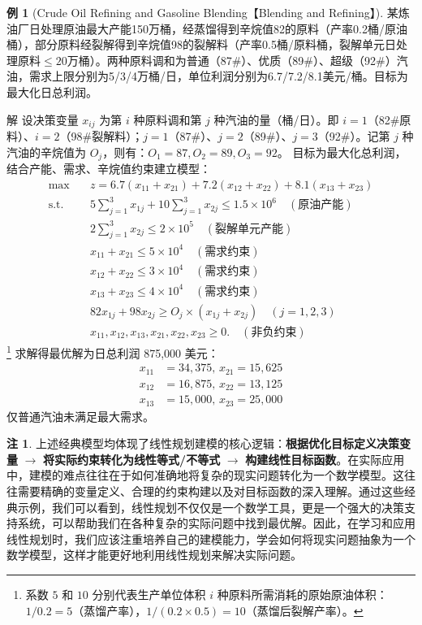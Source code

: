 \documentclass[12pt]{article}
\theoremstyle{plain}
\theoremstyle{definition}
\newtheorem{rmk}{注}[subsection]
\newtheorem{exm}{例}[subsection]
\newenvironment{slv}[1][解]{\begin{paragraph}{#1}\mbox{}}{\end{paragraph}\par\nopagebreak}
\newcommand{\st}{\mathrel{\text{s.t.}}}
\begin{document}
\begin{exm}[Crude Oil Refining and Gasoline Blending【Blending and Refining】]
    某炼油厂日处理原油最大产能150万桶，经蒸馏得到辛烷值82的原料（产率0.2桶/原油桶），部分原料经裂解得到辛烷值98的裂解料（产率0.5桶/原料桶，裂解单元日处理原料$\leq20$万桶）。两种原料调和为普通（87\#）、优质（89\#）、超级（92\#）汽油，需求上限分别为5/3/4万桶/日，单位利润分别为6.7/7.2/8.1美元/桶。目标为最大化日总利润。

    \begin{slv}
    设决策变量 $x_{ij}$ 为第 $i$ 种原料调和第 $j$ 种汽油的量（桶/日）。即 $i=1$（82\#原料）、$i=2$（98\#裂解料）；$j=1$（87\#）、$j=2$（89\#）、$j=3$（92\#）。记第 $j$ 种汽油的辛烷值为 $O_j$，则有：$O_1=87,O_2=89,O_3=92$。
    目标为最大化总利润，结合产能、需求、辛烷值约束建立模型：
    \begin{align*}
        \max \quad & z=6.7(x_{11}+x_{21})+7.2(x_{12}+x_{22})+8.1(x_{13}+x_{23}) \\
        \st \quad & 5\sum_{j=1}^3x_{1j}+10\sum_{j=1}^3x_{2j} \leq 1.5\times10^6 \quad (\text{原油产能}) \\
        & 2\sum_{j=1}^3x_{2j} \leq 2\times10^5 \quad (\text{裂解单元产能}) \\
        & x_{11}+x_{21} \leq 5\times10^4 \quad (\text{需求约束}) \\
        & x_{12}+x_{22} \leq 3\times10^4 \quad (\text{需求约束}) \\
        & x_{13}+x_{23} \leq 4\times10^4 \quad (\text{需求约束}) \\
        & 82x_{1j}+98x_{2j} \geq O_j \times (x_{1j}+x_{2j}) \quad (j=1,2,3) \\
        & x_{11},x_{12},x_{13},x_{21},x_{22},x_{23} \geq 0. \quad (\text{非负约束})
    \end{align*}
    \footnote{系数 $5$ 和 $10$ 分别代表生产单位体积 $i$ 种原料所需消耗的原始原油体积：$1/0.2=5$（蒸馏产率），$1/(0.2\times0.5)=10$（蒸馏后裂解产率）。}
    求解得最优解为日总利润 875,000 美元：
    \begin{align*}
        x_{11}&=34,375,\,x_{21}=15,625 \\
        x_{12}&=16,875,\,x_{22}=13,125 \\
        x_{13}&=15,000,\,x_{23}=25,000
    \end{align*}
    仅普通汽油未满足最大需求。
    \end{slv}
\end{exm}

\begin{rmk}
    上述经典模型均体现了线性规划建模的核心逻辑：\textbf{根据优化目标定义决策变量} $\rightarrow$ \textbf{将实际约束转化为线性等式/不等式} $\rightarrow$ \textbf{构建线性目标函数}。在实际应用中，建模的难点往往在于如何准确地将复杂的现实问题转化为一个数学模型。这往往需要精确的变量定义、合理的约束构建以及对目标函数的深入理解。通过这些经典示例，我们可以看到，线性规划不仅仅是一个数学工具，更是一个强大的决策支持系统，可以帮助我们在各种复杂的实际问题中找到最优解。因此，在学习和应用线性规划时，我们应该注重培养自己的建模能力，学会如何将现实问题抽象为一个数学模型，这样才能更好地利用线性规划来解决实际问题。
\end{rmk}
\end{document}
